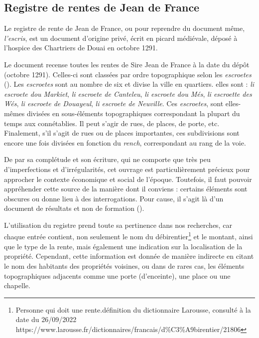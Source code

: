 \subsection{Registre de rentes de Jean de France}
Le registre de rente de Jean de France, ou pour reprendre du document même, \textit{l'escris}, est un document d'origine privé, écrit en picard médiévale, déposé à l'hospice des Chartriers de Douai en octobre 1291. 

Le document recense toutes les rentes de Sire Jean de France à la date du dépôt (octobre 1291). Celles-ci sont classées par ordre topographique selon les \textit{escroetes} (\cite{espinas_les_1933}). Les \textit{escroetes} sont au nombre de six et divise la ville en quartiers. elles sont : \textit{li escroete dou Markiet}, \textit{li escroete de Canteleu}, \textit{li escroete dou Més}, \textit{li escroette des Wés}, \textit{li escroete de Douayeul}, \textit{li escroete de Neuville}.
Ces \textit{escroetes}, sont elles-mêmes divisées en sous-éléments topographiques correspondant la plupart du temps aux connétablies. Il peut s'agir de rues, de places, de porte, etc. Finalement, s'il s'agit de rues ou de places importantes, ces subdivisions sont encore une fois divisées en fonction du \textit{rench}, correspondant au rang de la voie.

De par sa complétude et son écriture, qui ne comporte que très peu d'imperfections et d'irrégularités, cet ouvrage est particulièrement précieux pour approcher le contexte économique et social de l'époque. 
Toutefois, il faut pouvoir appréhender cette source de la manière dont il conviens : certains éléments sont obscures ou donne lieu à des interrogations. Pour cause, il s'agit là d'un document de résultats et non de formation (\cite{espinas_les_1933}).

L'utilisation du registre prend toute sa pertinence dans nos recherches, car chaque entrée contient, non seulement le nom du débirentier\footnote{\og Personne qui doit une rente.\fg  définition du dictionnaire Larousse, consulté à la date du 26/09/2022 https://www.larousse.fr/dictionnaires/francais/d\%C3\%A9birentier/21806} et le montant, ainsi que le type de la rente, mais également une indication sur la localisation de la propriété. Cependant, cette information est donnée de manière indirecte en citant le nom des habitants des propriétés voisines, ou dans de rares cas, les éléments topographiques adjacents comme une porte (d'enceinte), une place ou une chapelle.